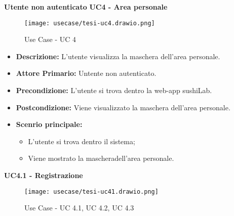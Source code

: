 \textbf{Utente non autenticato}
\textbf{UC4 - Area personale}
\begin{figure}[H]
    \centering
    \texttt{[image: usecase/tesi-uc4.drawio.png]}
    \caption{Use Case - UC 4}
\end{figure}
\begin{itemize}
    \item \textbf{Descrizione:} L'utente visualizza la maschera dell'area personale.
    \item \textbf{Attore Primario:} Untente non autenticato.
    \item \textbf{Precondizione:} L'utente si trova dentro la web-app sushiLab.
    \item \textbf{Postcondizione:} Viene visualizzato la maschera dell'area personale.
    \item \textbf{Scenrio principale:}
    \begin{itemize}
        \item L'utente si trova dentro il sistema;
        \item Viene mostrato la mascheradell'area personale.
    \end{itemize}
\end{itemize}
\textbf{UC4.1 - Registrazione}
\begin{figure}[H]
    \centering
    \texttt{[image: usecase/tesi-uc41.drawio.png]}
    \caption{Use Case - UC 4.1, UC 4.2, UC 4.3}
\end{figure}
